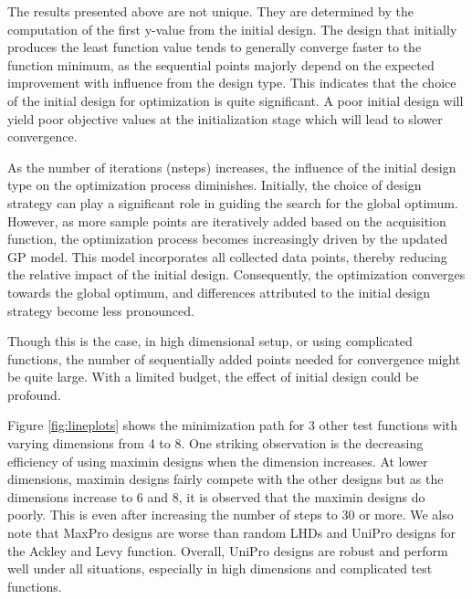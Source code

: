 \documentclass [PhD] {package/uclathes}
\begin{document}
The results presented above are not unique. They are determined by the computation of the first y-value from the initial design. The design that initially produces the least function value tends to generally converge faster to the function minimum, as the sequential points majorly depend on the expected improvement with influence from the design type. This indicates that the choice of the initial design for optimization is quite significant. A poor initial design will yield poor objective values at the initialization stage which will lead to slower convergence.

As the number of iterations (nsteps) increases, the influence of the initial design type on the optimization process diminishes. Initially, the choice of design strategy can play a significant role in guiding the search for the global optimum. However, as more sample points are iteratively added based on the acquisition function, the optimization process becomes increasingly driven by the updated GP model. This model incorporates all collected data points, thereby reducing the relative impact of the initial design. Consequently, the optimization converges towards the global optimum, and differences attributed to the initial design strategy become less pronounced.

Though this is the case, in high dimensional setup, or using complicated functions, the number of sequentially added points needed for convergence might be quite large. With a limited budget, the effect of initial design could be profound.

Figure \ref{fig:lineplots} shows the minimization path for 3 other test functions with varying dimensions from 4 to 8.
One striking observation is the decreasing efficiency of using maximin designs when the dimension increases. At lower dimensions,  maximin designs fairly compete with the other designs but as the dimensions increase to 6 and 8, it is observed that the maximin designs do poorly. This is even after increasing the number of steps to 30 or more. We also note that  MaxPro designs are  worse than  random LHDs and UniPro designs for the Ackley and Levy function. Overall, UniPro designs are robust and perform well under all situations, especially in high dimensions and complicated test functions.
\end{document}
